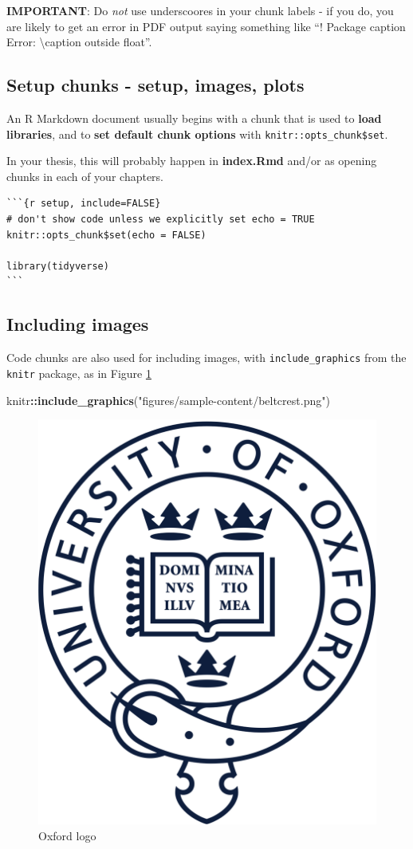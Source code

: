\documentclass[a4paper, twoside]{templates/ociamthesis}
\newenvironment{Shaded}{\begin{snugshade}}{\end{snugshade}}
\newcommand{\KeywordTok}[1]{\textcolor[rgb]{0.13,0.29,0.53}{\textbf{#1}}}
\newcommand{\NormalTok}[1]{#1}
\newcommand{\OperatorTok}[1]{\textcolor[rgb]{0.81,0.36,0.00}{\textbf{#1}}}
\newcommand{\StringTok}[1]{\textcolor[rgb]{0.31,0.60,0.02}{#1}}
\renewenvironment{Shaded}
{
  \vspace{10pt}%
  \begin{snugshade}%
}{%
  \end{snugshade}%
  \vspace{8pt}%
}
\theoremstyle{definition}
\theoremstyle{definition}
\theoremstyle{definition}
\theoremstyle{definition}
\theoremstyle{remark}
\begin{document}
\textbf{IMPORTANT}: Do \emph{not} use underscoores in your chunk labels - if you do, you are likely to get an error in PDF output saying something like ``! Package caption Error: \textbackslash caption outside float''.

\hypertarget{setup-chunks---setup-images-plots}{%
\subsection{Setup chunks - setup, images, plots}\label{setup-chunks---setup-images-plots}}

An R Markdown document usually begins with a chunk that is used to \textbf{load libraries}, and to \textbf{set default chunk options} with \texttt{knitr::opts\_chunk\$set}.

In your thesis, this will probably happen in \textbf{index.Rmd} and/or as opening chunks in each of your chapters.

\begin{verbatim}
```{r setup, include=FALSE}
# don't show code unless we explicitly set echo = TRUE
knitr::opts_chunk$set(echo = FALSE)

library(tidyverse)
```
\end{verbatim}

\hypertarget{including-images}{%
\subsection{Including images}\label{including-images}}

Code chunks are also used for including images, with \texttt{include\_graphics} from the \texttt{knitr} package, as in Figure \ref{fig:oxford-logo}

\begin{Shaded}
\begin{Highlighting}[]
\NormalTok{knitr}\OperatorTok{::}\KeywordTok{include\_graphics}\NormalTok{(}\StringTok{"figures/sample{-}content/beltcrest.png"}\NormalTok{)}
\end{Highlighting}
\end{Shaded}

\begin{figure}

{\centering \includegraphics[width=0.5\linewidth]{figures/sample-content/beltcrest} 

}

\caption{Oxford logo}\label{fig:oxford-logo}
\end{figure}
\end{document}
